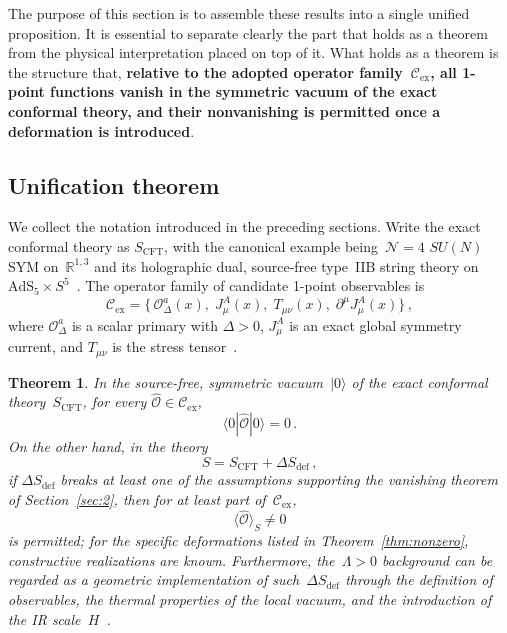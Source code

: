 \documentclass[
  aps,
  prd,
  preprint,
  groupedaddress,
  nofootinbib,
  longbibliography
]{revtex4-2}
\newtheorem{theorem}[definition]{Theorem}
\theoremstyle{remark}
\newcommand{\Cex}{\mathcal{C}_{\mathrm{ex}}}
\newcommand{\N}{\mathcal{N}}
\newcommand{\AdS}{\mathrm{AdS}}
\begin{document}
The purpose of this section is to assemble these results into a
single unified proposition.
It is essential to separate clearly the part that holds as a
theorem from the physical interpretation placed on top of it.
What holds as a theorem is the structure that, \textbf{relative
to the adopted operator family~$\Cex$, all 1-point functions
vanish in the symmetric vacuum of the exact conformal theory,
and their nonvanishing is permitted once a deformation is
introduced}.

\subsection{Unification theorem}\label{subsec:5-1}

We collect the notation introduced in the preceding sections.
Write the exact conformal theory as
$S_{\mathrm{CFT}}$,
with the canonical example being~$\N=4$ $SU(N)$ SYM
on~$\mathbb{R}^{1,3}$ and its holographic dual, source-free
type~IIB string theory on~$\AdS_5\times
S^5$~\cite{ref1,ref2,ref3,ref4}.
The operator family of candidate 1-point observables is
\begin{equation}\label{eq:Cex-recall}
  \Cex = \bigl\{\,
    \mathcal{O}_\Delta^a(x),\;
    J_\mu^A(x),\;
    T_{\mu\nu}(x),\;
    \partial^\mu J_\mu^A(x)
  \bigr\}\,,
\end{equation}
where $\mathcal{O}_\Delta^a$ is a scalar primary with
$\Delta>0$, $J_\mu^A$ is an exact global symmetry current, and
$T_{\mu\nu}$ is the stress
tensor~\cite{ref4,ref5,ref6,ref7,ref13,ref14}.

\begin{theorem}\label{thm:unification}
In the source-free, symmetric vacuum~$|0\rangle$ of the exact
conformal theory~$S_{\mathrm{CFT}}$, for every
$\hat{\mathcal{O}}\in\Cex$,
\begin{equation}\label{eq:unif-vanish}
  \langle 0|\hat{\mathcal{O}}|0\rangle = 0\,.
\end{equation}
On the other hand, in the theory
\begin{equation}\label{eq:deformed-theory-unif}
  S = S_{\mathrm{CFT}} + \Delta S_{\mathrm{def}}\,,
\end{equation}
if $\Delta S_{\mathrm{def}}$ breaks at least one of the
assumptions supporting the vanishing theorem of
Section~\ref{sec:2}, then for at least part of~$\Cex$,
\begin{equation}\label{eq:unif-nonzero}
  \langle\hat{\mathcal{O}}\rangle_S \neq 0
\end{equation}
is permitted; for the specific deformations listed in
Theorem~\ref{thm:nonzero}, constructive realizations are known.
Furthermore, the~$\Lambda>0$ background can be regarded as a
geometric implementation of such~$\Delta S_{\mathrm{def}}$
through the definition of observables, the thermal properties
of the local vacuum, and the introduction of the IR
scale~$H$~\cite{ref15,ref16,ref17,ref18,ref19,ref20,ref21,
  ref22,ref23,ref24,ref25,ref26,ref27}.
\end{theorem}
\end{document}
